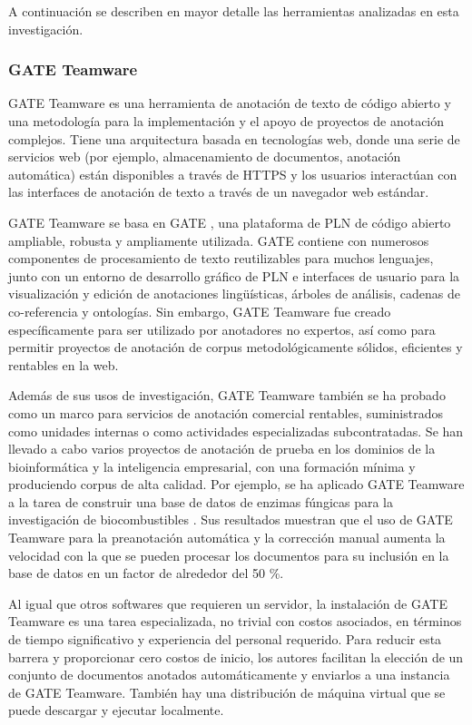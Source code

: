 A continuación se describen en mayor detalle las herramientas analizadas en esta investigación.

\subsubsection*{GATE Teamware}

GATE Teamware es una herramienta de anotación de texto de código abierto y una metodología para la implementación y el apoyo de proyectos de anotación complejos. 
Tiene una arquitectura basada en tecnologías web, donde una serie de servicios web (por ejemplo, almacenamiento de documentos, anotación automática) están disponibles a través de HTTPS y los usuarios interactúan con las interfaces de anotación de texto a través de un navegador web estándar.

GATE Teamware se basa en GATE \cite{Cunningham2011}, una plataforma de PLN de código abierto ampliable, robusta y ampliamente utilizada. 
GATE contiene con numerosos componentes de procesamiento de texto reutilizables para muchos lenguajes, junto con un entorno de desarrollo gráfico de PLN e interfaces de usuario para la visualización y edición de anotaciones lingüísticas, árboles de análisis, cadenas de co-referencia y ontologías. 
Sin embargo, GATE Teamware fue creado específicamente para ser utilizado por anotadores no expertos, así como para permitir proyectos de anotación de corpus metodológicamente sólidos, eficientes y rentables en la web.

Además de sus usos de investigación, GATE Teamware también se ha probado como un marco para servicios de anotación comercial rentables, suministrados como unidades internas o como actividades especializadas subcontratadas. 
Se han llevado a cabo varios proyectos de anotación de prueba en los dominios de la bioinformática y la inteligencia empresarial, con una formación mínima y produciendo corpus de alta calidad. 
Por ejemplo, se ha aplicado GATE Teamware a la tarea de construir una base de datos de enzimas fúngicas para la investigación de biocombustibles \cite{Meurs2011}. 
Sus resultados muestran que el uso de GATE Teamware para la preanotación automática y la corrección manual aumenta la velocidad con la que se pueden procesar los documentos para su inclusión en la base de datos en un factor de alrededor del 50 \%.

Al igual que otros softwares que requieren un servidor, la instalación de GATE Teamware es una tarea especializada, no trivial con costos asociados, en términos de tiempo significativo y experiencia del personal requerido. 
Para reducir esta barrera y proporcionar cero costos de inicio, los autores facilitan la elección de un conjunto de documentos anotados automáticamente y enviarlos a una instancia de GATE Teamware. 
También hay una distribución de máquina virtual que se puede descargar y ejecutar localmente.

